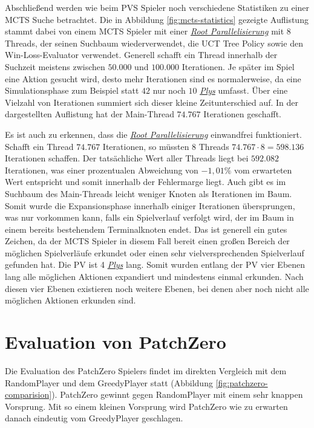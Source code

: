 Abschließend werden wie beim \ac{PVS} Spieler noch verschiedene Statistiken zu einer \ac{MCTS} Suche betrachtet. Die in Abbildung \ref{fig:mcts-statistics} gezeigte Auflistung stammt dabei von einem \ac{MCTS} Spieler mit einer \hyperref[text:root-parallelization]{\emph{Root Parallelisierung}} mit 8 Threads, der seinen Suchbaum wiederverwendet, die \ac{UCT} Tree Policy sowie den Win-Loss-Evaluator verwendet. Generell schafft ein Thread innerhalb der Suchzeit meistens zwischen $50{.}000$ und $100{.}000$ Iterationen. Je später im Spiel eine Aktion gesucht wird, desto mehr Iterationen sind es normalerweise, da eine Simulationsphase zum Beispiel statt $42$ nur noch $10$ \hyperref[text:ply]{\emph{Plys}} umfasst. Über eine Vielzahl von Iterationen summiert sich dieser kleine Zeitunterschied auf. In der dargestellten Auflistung hat der Main-Thread $74{.}767$ Iterationen geschafft.

Es ist auch zu erkennen, dass die \hyperref[text:root-parallelization]{\emph{Root Parallelisierung}} einwandfrei funktioniert. Schafft ein Thread $74{.}767$ Iterationen, so müssten 8 Threads $74{.}767 \cdot 8 = 598{.}136$ Iterationen schaffen. Der tatsächliche Wert aller Threads liegt bei $592{.}082$ Iterationen, was einer prozentualen Abweichung von $-1{,}01\%$ vom erwarteten Wert entspricht und somit innerhalb der Fehlermarge liegt. Auch gibt es im Suchbaum des Main-Threads leicht weniger Knoten als Iterationen im Baum. Somit wurde die Expansionsphase innerhalb einiger Iterationen übersprungen, was nur vorkommen kann, falls ein Spielverlauf verfolgt wird, der im Baum in einem bereits bestehendem Terminalknoten endet. Das ist generell ein gutes Zeichen, da der \ac{MCTS} Spieler in diesem Fall bereit einen großen Bereich der möglichen Spielverläufe erkundet oder einen sehr vielversprechenden Spielverlauf gefunden hat. Die \acl{PV} ist 4 \hyperref[text:ply]{\emph{Plys}} lang. Somit wurden entlang der \ac{PV} vier Ebenen lang alle möglichen Aktionen expandiert und mindestens einmal erkunden. Nach diesen vier Ebenen existieren noch weitere Ebenen, bei denen aber noch nicht alle möglichen Aktionen erkunden sind.

\section{Evaluation von PatchZero}

Die Evaluation des PatchZero Spielers findet im direkten Vergleich mit dem RandomPlayer und dem GreedyPlayer statt (Abbildung \ref{fig:patchzero-comparision}). PatchZero gewinnt gegen RandomPlayer mit einem sehr knappen Vorsprung. Mit so einem kleinen Vorsprung wird PatchZero wie zu erwarten danach eindeutig vom GreedyPlayer geschlagen.

